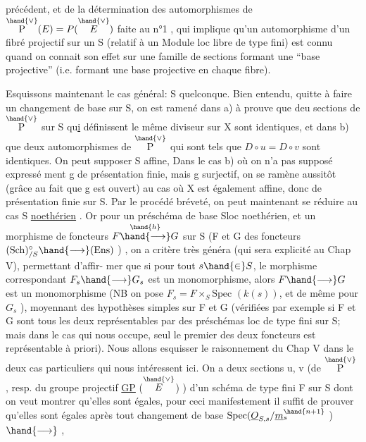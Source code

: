 
précédent, et de la détermination des automorphismes de $\overset{\hand{\vee}}{\mathrm{P}}(E) = P(\overset{\hand{\vee}}{E})$ faite
au n°1 , qui implique qu'un automorphisme d'un fibré projectif sur un S
(relatif à un Module loc libre de type fini)  est connu quand on connait
son effet sur une famille de sections formant une ``base projective''
(i.e. formant une base projective en chaque  fibre).

Esquissons maintenant le cas général: S quelconque.  Bien entendu,
quitte à faire un changement de base sur S, on est ramené dans a) à prouve
que deu sections  de $\overset{\hand{\vee}}{\mathrm{P}}$ sur S  qu\uline{i} définissent le même diviseur sur X sont
identiques, et dans b) que deux automorphismes  de $\overset{\hand{\vee}}{\mathrm{P}}$  qui sont tels que
$D\circ u = D\circ v$  sont identiques. On peut supposer  S affine, Dans le cas b) où on n'a pas supposé expressé%
ment  g de présentation finie, mais g surjectif, on se ramène aussitôt
(grâce au fait que g est ouvert) au cas où X est également affine, donc
de présentation finie sur S.  Par le procédé bréveté, on peut maintenant
se réduire au cas S \uline{noethérien} .  Or pour un préschéma de base Sloc noethérien,
et un morphisme de foncteurs  $F \overset{\hand{h}}{\hand{\longrightarrow}} G$ sur S  (F et G des foncteurs
$(\mathrm{Sch})_{/S}^{\circ} \hand{\longrightarrow} (\mathrm{Ens})$ ) ,  on a  critère très généra (qui sera explicité au Chap V), permettant d'affir-%
mer que si  pour tout  $s \hand{\in} S$, le morphisme correspondant $F_s \hand{\longrightarrow} G_s$ est
un monomorphisme, alors $F \hand{\longrightarrow} G$ est un monomorphisme  (NB on pose $F_s{=}F\times_S\mathrm{Spec}$
$(k(s))$, et de même pour $G_s$ ),  moyennant des hypothèses simples sur F et G
(vérifiées par exemple si F et G sont tous les deux représentables par des
préschémas loc de type fini sur S; mais dans le cas qui nous occupe, seul
le premier des deux foncteurs est représentable à priori).  Nous allons
esquisser le raisonnement du Chap V  dans le deux cas particuliers qui nous
intéressent ici.  On a deux sections u, v (de $\overset{\hand{\vee}}{\mathrm{P}}$ , resp. du groupe projectif
\uline{GP} ($\overset{\hand{\vee}}{E}$) ) d'un schéma de type fini F sur S dont on veut montrer qu'elles
sont égales, pour ceci manifestement il suffit de prouver qu'elles sont
égales après tout changement de base  $\mathrm{Spec}(\underline{O}_{S,s}/\underline{m}_s^{\hand{n+1}}$ ) $\hand{\longrightarrow}$ ,

